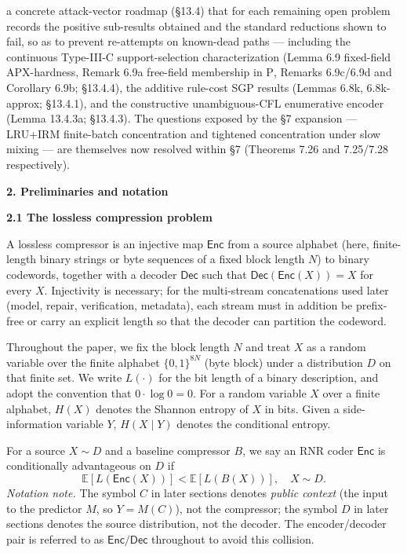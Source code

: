 \documentclass[
]{article}
\begin{document}
a concrete attack-vector roadmap (§13.4) that for each remaining open
problem records the positive sub-results obtained and the standard
reductions shown to fail, so as to prevent re-attempts on known-dead
paths --- including the continuous Type-III-C support-selection
characterization (Lemma 6.9 fixed-field APX-hardness, Remark 6.9a
free-field membership in $\mathrm{P}$, Remarks 6.9c/6.9d and
Corollary 6.9b; §13.4.4), the additive rule-cost SGP results
(Lemmas 6.8k, 6.8k-approx; §13.4.1), and the constructive
unambiguous-CFL enumerative encoder (Lemma 13.4.3a; §13.4.3). The
questions exposed by the §7 expansion --- LRU+IRM finite-batch
concentration and tightened concentration under slow mixing --- are
themselves now resolved within §7 (Theorems 7.26 and 7.25/7.28
respectively).

\textbf{2. Preliminaries and notation}

\textbf{2.1 The lossless compression problem}

A lossless compressor is an injective map
$\mathsf{Enc}$ from a source alphabet (here, finite-length binary
strings or byte sequences of a fixed block length $N$) to binary
codewords, together with a decoder $\mathsf{Dec}$ such that
$\mathsf{Dec}(\mathsf{Enc}(X)) = X$ for every $X$. Injectivity is
necessary; for the multi-stream concatenations used later (model,
repair, verification, metadata), each stream must in addition be
prefix-free or carry an explicit length so that the decoder can
partition the codeword.

Throughout the paper, we fix the block length $N$ and treat $X$ as a
random variable over the finite alphabet $\{0,1\}^{8N}$ (byte block)
under a distribution $D$ on that finite set. We write $L(\cdot)$ for
the bit length of a binary description, and adopt the convention
that $0 \cdot \log 0 = 0$. For a random variable $X$ over a finite
alphabet, $H(X)$ denotes the Shannon entropy of $X$ in bits. Given
a side-information variable $Y$, $H(X \mid Y)$ denotes the
conditional entropy.

For a source $X \sim D$ and a baseline compressor $B$, we say an RNR
coder $\mathsf{Enc}$ is conditionally advantageous on $D$ if
\[
\mathbb{E}[L(\mathsf{Enc}(X))] < \mathbb{E}[L(B(X))], \quad X \sim D.
\tag{2.1}
\]
\emph{Notation note.} The symbol $C$ in later sections denotes
\emph{public context} (the input to the predictor $M$, so
$Y = M(C)$), not the compressor; the symbol $D$ in later sections
denotes the source distribution, not the decoder. The
encoder/decoder pair is referred to as $\mathsf{Enc}/\mathsf{Dec}$
throughout to avoid this collision.
\end{document}
